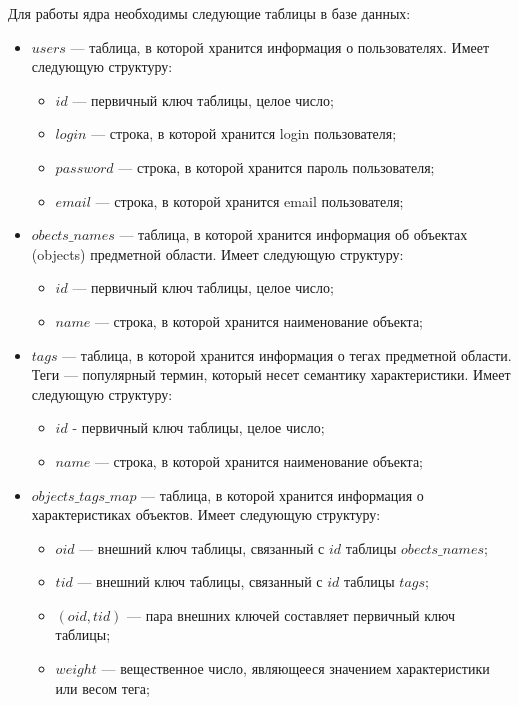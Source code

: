 Для работы ядра необходимы следующие таблицы в базе данных:
\begin{itemize}
\item $users$ --- таблица, в которой хранится информация о пользователях. Имеет
	следующую структуру:
  \begin{itemize}
    \item $id$ --- первичный ключ таблицы, целое число;
    \item $login$ --- строка, в которой хранится login пользователя;
    \item $password$ --- строка, в которой хранится пароль пользователя;
    \item $email$ --- строка, в которой хранится email пользователя;
  \end{itemize}
\item $obects\_names$ --- таблица, в которой хранится информация об объектах (objects) предметной области. Имеет следующую структуру:
  \begin{itemize}
    \item $id$ --- первичный ключ таблицы, целое число;
    \item $name$ --- строка, в которой хранится наименование объекта;
  \end{itemize}
\item $tags$  --- таблица, в которой хранится информация о тегах
	предметной области. Теги --- популярный термин, который несет семантику характеристики. Имеет следующую структуру:
  \begin{itemize}
    \item $id$ - первичный ключ таблицы, целое число;
    \item $name$ --- строка, в которой хранится наименование объекта;
  \end{itemize}
\item $objects\_tags\_map$ --- таблица, в которой хранится информация о характеристиках объектов. Имеет следующую структуру:
  \begin{itemize}
    \item $oid$ --- внешний ключ таблицы, связанный с $id$ таблицы $obects\_names$;
    \item $tid$ --- внешний ключ таблицы, связанный с $id$ таблицы $tags$;
    \item $(oid, tid)$ --- пара внешних ключей составляет первичный ключ таблицы;
    \item $weight$ --- вещественное число, являющееся значением характеристики или весом тега;
  \end{itemize}
\end{itemize}

